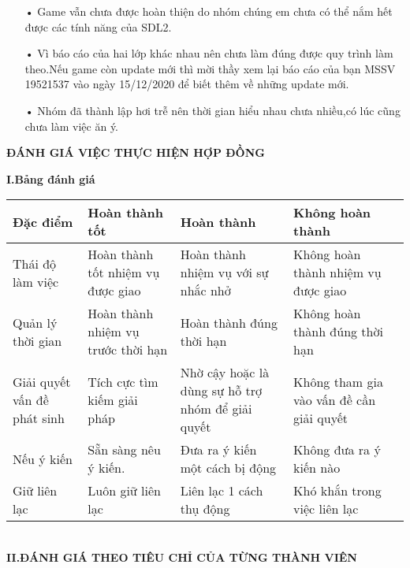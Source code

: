\documentclass{article}
\begin{document}
\begin{itemize}
    \item [•]Game vẫn chưa được hoàn thiện do nhóm chúng em chưa có thể nắm hết được các tính năng của SDL2.
    \item[•]Vì báo cáo của hai lớp khác nhau nên chưa làm đúng được quy trình làm theo.Nếu game còn update mới thì mời thầy xem lại báo cáo của bạn MSSV 19521537 vào ngày 15/12/2020 để biết thêm về những update mới.
    \item[•]Nhóm đã thành lập hơi trễ nên thời gian hiểu nhau chưa nhiều,có lúc cũng chưa làm việc ăn ý.
\end{itemize}
\newpage
\begin{center}
    \textbf{\Large ĐÁNH GIÁ VIỆC THỰC HIỆN HỢP ĐỒNG }
\end{center}
\textbf{I.Bảng đánh giá}\\
\begin{tabular}{|>{\raggedright\arraybackslash}p{4cm}
|>{\raggedright\arraybackslash}p{4cm}
|>{\raggedright\arraybackslash}p{4cm}
|>{\raggedright\arraybackslash}p{4cm}
|>{\raggedright\arraybackslash}p{4cm}|}
    \hline
        Đặc điểm
        & Hoàn thành tốt
        & Hoàn thành
        & Không hoàn thành\\
    \hline
        Thái độ làm việc
        & Hoàn thành tốt nhiệm vụ được giao
        & Hoàn thành nhiệm vụ với sự nhắc nhở
        & Không hoàn thành nhiệm vụ được giao\\
    \hline
        Quản lý thời gian
        & Hoàn thành nhiệm vụ trước thời hạn
        & Hoàn thành đúng thời hạn
        & Không hoàn thành đúng thời hạn
        \\
    \hline
        Giải quyết vấn đề phát sinh
        & Tích cực tìm kiếm giải pháp
        & Nhờ cậy hoặc là dùng sự hỗ trợ nhóm để giải quyết
        & Không tham gia vào vấn đề cần giải quyết
        \\
    \hline
        Nếu ý kiến
        & Sẵn sàng nêu ý kiến.
        & Đưa ra ý kiến một cách bị động
        & Không đưa ra ý kiến nào
        \\
    \hline
        Giữ liên lạc
        & Luôn giữ liên lạc
        & Liên lạc 1 cách thụ động
        & Khó khắn trong việc liên lạc
        \\
    \hline
        
\end{tabular}\\
\textbf{II.ĐÁNH GIÁ THEO TIÊU CHỈ CỦA TỪNG THÀNH VIÊN}
\end{document}
